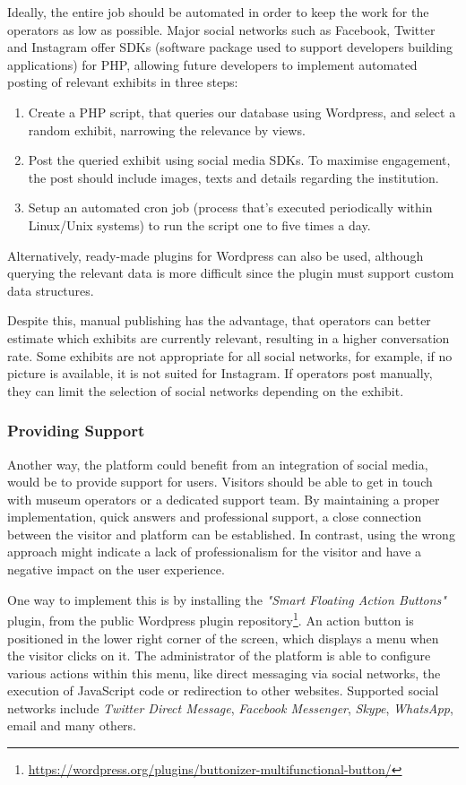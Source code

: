\noindent Ideally, the entire job should be automated in order to keep the work for the operators as low as possible. Major social networks such as Facebook, Twitter and Instagram offer SDKs (software package used to support developers building applications) for PHP, allowing future developers to implement automated posting of relevant exhibits in three steps:

\begin{enumerate}
    \item Create a PHP script, that queries our database using Wordpress, and select a random exhibit, narrowing the relevance by views.
    \item Post the queried exhibit using social media SDKs. To maximise engagement, the post should include images, texts and details regarding the institution.
    \item Setup an automated cron job (process that's executed periodically within Linux/Unix systems) to run the script one to five times a day.
\end{enumerate}

\noindent Alternatively, ready-made plugins for Wordpress can also be used, although querying the relevant data is more difficult since the plugin must support custom data structures. 

Despite this, manual publishing has the advantage, that operators can better estimate which exhibits are currently relevant, resulting in a higher conversation rate. Some exhibits are not appropriate for all social networks, for example, if no picture is available, it is not suited for Instagram. If operators post manually, they can limit the selection of social networks depending on the exhibit.

\subsubsection{Providing Support} \label{social_support}

Another way, the platform could benefit from an integration of social media, would be to provide support for users. Visitors should be able to get in touch with museum operators or a dedicated support team. By maintaining a proper implementation, quick answers and professional support, a close connection between the visitor and platform can be established. In contrast, using the wrong approach might indicate a lack of professionalism for the visitor and have a negative impact on the user experience. 

One way to implement this is by installing the \emph{"Smart Floating Action Buttons"} plugin, from the public Wordpress plugin repository\footnote{\url{https://wordpress.org/plugins/buttonizer-multifunctional-button/}}. An action button is positioned in the lower right corner of the screen, which displays a menu when the visitor clicks on it. The administrator of the platform is able to configure various actions within this menu, like direct messaging via social networks, the execution of JavaScript code or redirection to other websites. Supported social networks include \emph{Twitter Direct Message}, \emph{Facebook Messenger}, \emph{Skype}, \emph{WhatsApp}, email and many others. 


